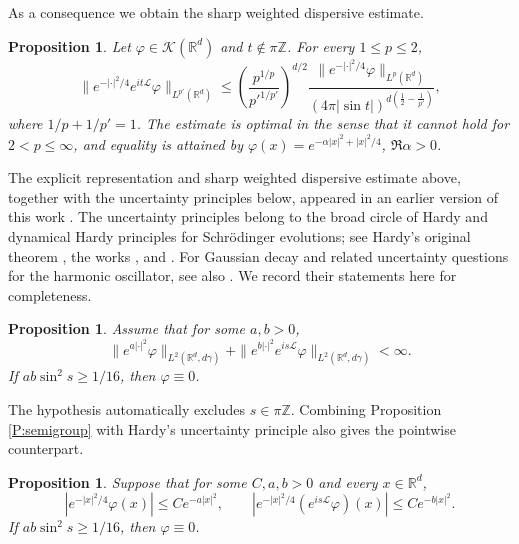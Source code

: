 \documentclass[11pt,a4paper]{amsart}
\def \vf{\varphi}
\newcommand{\Rm}{\mathbb R^d}
\numberwithin{equation}{section}
\newtheorem{proposition}[theorem]{Proposition}
\numberwithin{equation}{section}
\begin{document}
As a consequence we obtain the sharp weighted dispersive estimate.
\begin{proposition}\label{P:disp}
Let $\vf\in\mathscr K(\Rm)$ and $t\notin\pi\mathbb Z$. For every $1\le p\le2$,
\begin{equation}\label{disp}
\|e^{-|\cdot|^2/4}e^{it\mathscr L}\vf\|_{L^{p'}(\Rm)}
\le
\left(\frac{p^{1/p}}{{p'}^{1/p'}}\right)^{d/2}
\frac{\|e^{-|\cdot|^2/4}\vf\|_{L^p(\Rm)}}
{(4\pi|\sin t|)^{d(\frac12-\frac1{p'})}},
\end{equation}
where $1/p+1/p'=1$.  The estimate is optimal in the sense that it cannot hold for $2<p\le\infty$, and equality is attained by $\vf(x)=e^{-\alpha|x|^2+|x|^2/4}$, $\Re\alpha>0$.
\end{proposition}

The explicit representation and sharp weighted dispersive estimate above, together with the uncertainty principles below, appeared in an earlier version of this work \cite{GarOUpre}.  The uncertainty principles belong to the broad circle of Hardy and dynamical Hardy principles for Schr\"odinger evolutions; see Hardy's original theorem \cite{Ha}, the works \cite{EKPVcpde,EKPVjems,EKPVduke,CEKPV,EKPVjlms}, and \cite{CP,SST,Fo,Veluma,FM}.  For Gaussian decay and related uncertainty questions for the harmonic oscillator, see also \cite{CF,KJO,RR}.  We record their statements here for completeness.

\begin{proposition}\label{P:main}
Assume that for some $a,b>0$,
\begin{equation}\label{L2}
\|e^{a|\cdot|^2}\vf\|_{L^2(\Rm,d\gamma)}
+\|e^{b|\cdot|^2}e^{is\mathscr L}\vf\|_{L^2(\Rm,d\gamma)}<\infty.
\end{equation}
If $ab\sin^2s\ge1/16$, then $\vf\equiv0$.
\end{proposition}

The hypothesis automatically excludes $s\in\pi\mathbb Z$.  Combining Proposition \ref{P:semigroup} with Hardy's uncertainty principle also gives the pointwise counterpart.

\begin{proposition}\label{P:main2}
Suppose that for some $C,a,b>0$ and every $x\in\Rm$,
\begin{equation}\label{Linfty}
|e^{-|x|^2/4}\vf(x)|\le Ce^{-a|x|^2},\qquad
|e^{-|x|^2/4}(e^{is\mathscr L}\vf)(x)|\le Ce^{-b|x|^2}.
\end{equation}
If $ab\sin^2s\ge1/16$, then $\vf\equiv0$.
\end{proposition}
\end{document}

